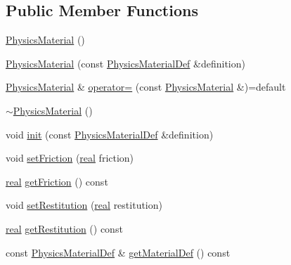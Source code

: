 \subsection*{Public Member Functions}
\begin{DoxyCompactItemize}
\item 
\mbox{\hyperlink{classr3_1_1_physics_material_adf01a85845faf2303264617b4756946b}{Physics\+Material}} ()
\item 
\mbox{\hyperlink{classr3_1_1_physics_material_ae3b11163453e24be78d2c51a638b0708}{Physics\+Material}} (const \mbox{\hyperlink{structr3_1_1_physics_material_def}{Physics\+Material\+Def}} \&definition)
\item 
\mbox{\hyperlink{classr3_1_1_physics_material}{Physics\+Material}} \& \mbox{\hyperlink{classr3_1_1_physics_material_a2c2b9752b5d5305ca2189e91fb8979e6}{operator=}} (const \mbox{\hyperlink{classr3_1_1_physics_material}{Physics\+Material}} \&)=default
\item 
\mbox{\hyperlink{classr3_1_1_physics_material_a795d62d5fa009bb6aa7d37627ccc4fd0}{$\sim$\+Physics\+Material}} ()
\item 
void \mbox{\hyperlink{classr3_1_1_physics_material_a13509f5494d00fdd5356ca6101c620ac}{init}} (const \mbox{\hyperlink{structr3_1_1_physics_material_def}{Physics\+Material\+Def}} \&definition)
\item 
void \mbox{\hyperlink{classr3_1_1_physics_material_a8193e719476e1b22ba61b9cd15066437}{set\+Friction}} (\mbox{\hyperlink{namespacer3_ab2016b3e3f743fb735afce242f0dc1eb}{real}} friction)
\item 
\mbox{\hyperlink{namespacer3_ab2016b3e3f743fb735afce242f0dc1eb}{real}} \mbox{\hyperlink{classr3_1_1_physics_material_ace861dc19a676ebdb19193076b24a458}{get\+Friction}} () const
\item 
void \mbox{\hyperlink{classr3_1_1_physics_material_a2056c195a2d655aefe9a480c28e67ddb}{set\+Restitution}} (\mbox{\hyperlink{namespacer3_ab2016b3e3f743fb735afce242f0dc1eb}{real}} restitution)
\item 
\mbox{\hyperlink{namespacer3_ab2016b3e3f743fb735afce242f0dc1eb}{real}} \mbox{\hyperlink{classr3_1_1_physics_material_a555b73c2bde3679b0e40087455eab61e}{get\+Restitution}} () const
\item 
const \mbox{\hyperlink{structr3_1_1_physics_material_def}{Physics\+Material\+Def}} \& \mbox{\hyperlink{classr3_1_1_physics_material_a652318d9fa4f6db099dc58d6f6ae314a}{get\+Material\+Def}} () const
\end{DoxyCompactItemize}


